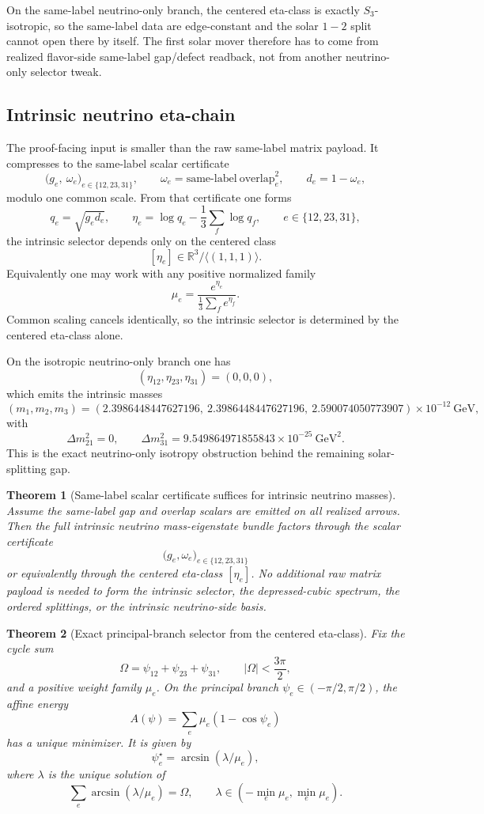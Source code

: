 \documentclass[11pt]{article}
\newtheorem{theorem}{Theorem}[section]
\begin{document}
On the same-label neutrino-only branch, the centered eta-class is exactly \(S_3\)-isotropic, so
the same-label data are edge-constant and the solar \(1\!-\!2\) split cannot open there by itself.
The first solar mover therefore has to come from realized flavor-side same-label gap/defect
readback, not from another neutrino-only selector tweak.

\subsection{Intrinsic neutrino eta-chain}

The proof-facing input is smaller than the raw same-label matrix payload. It compresses to the
same-label scalar certificate
\[
\bigl(g_e,\ \omega_e\bigr)_{e\in\{12,23,31\}},
\qquad
\omega_e=\mathrm{same\text{-}label\ overlap}_e^2,
\qquad
d_e=1-\omega_e,
\]
modulo one common scale. From that certificate one forms
\[
q_e=\sqrt{g_e d_e},
\qquad
\eta_e=\log q_e-\frac13\sum_f \log q_f,
\qquad
e\in\{12,23,31\},
\]
the intrinsic selector depends only on the centered class
\[
[\eta_e]\in \mathbb{R}^3/\langle(1,1,1)\rangle.
\]
Equivalently one may work with any positive normalized family
\[
\mu_e=\frac{e^{\eta_e}}{\frac13\sum_f e^{\eta_f}}.
\]
Common scaling cancels identically, so the intrinsic selector is determined by the centered
eta-class alone.

On the isotropic neutrino-only branch one has
\[
(\eta_{12},\eta_{23},\eta_{31})=(0,0,0),
\]
which emits the intrinsic masses
\[
(m_1,m_2,m_3)=
(2.3986448447627196,\ 2.3986448447627196,\ 2.590074050773907)\times10^{-12}\ \mathrm{GeV},
\]
with
\[
\Delta m_{21}^2=0,
\qquad
\Delta m_{31}^2=9.549864971855843\times10^{-25}\ \mathrm{GeV}^2.
\]
This is the exact neutrino-only isotropy obstruction behind the remaining solar-splitting gap.

\begin{theorem}[Same-label scalar certificate suffices for intrinsic neutrino masses]
Assume the same-label gap and overlap scalars are emitted on all realized arrows. Then the full
intrinsic neutrino mass-eigenstate bundle factors through the scalar certificate
\[
\bigl(g_e,\omega_e\bigr)_{e\in\{12,23,31\}}
\]
or equivalently through the centered eta-class \([\eta_e]\). No additional raw matrix payload is
needed to form the intrinsic selector, the depressed-cubic spectrum, the ordered splittings, or
the intrinsic neutrino-side basis.
\end{theorem}

\begin{theorem}[Exact principal-branch selector from the centered eta-class]
Fix the cycle sum
\[
\Omega=\psi_{12}+\psi_{23}+\psi_{31},
\qquad |\Omega|<\frac{3\pi}{2},
\]
and a positive weight family \(\mu_e\). On the principal branch
\(\psi_e\in(-\pi/2,\pi/2)\), the affine energy
\[
A(\psi)=\sum_e \mu_e(1-\cos\psi_e)
\]
has a unique minimizer. It is given by
\[
\psi_e^\star=\arcsin(\lambda/\mu_e),
\]
where \(\lambda\) is the unique solution of
\[
\sum_e \arcsin(\lambda/\mu_e)=\Omega,
\qquad
\lambda\in(-\min_e\mu_e,\min_e\mu_e).
\]
\end{theorem}
\end{document}
